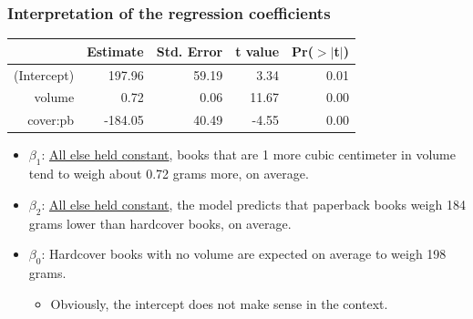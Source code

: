 \documentclass{beamer}
\begin{document}
\begin{frame}
\frametitle{Interpretation of the regression coefficients}

{\small
\begin{center}
\begin{tabular}{rrrrr}
  \hline
 & Estimate & Std. Error & t value & Pr($>$$|$t$|$) \\ 
  \hline
(Intercept) & 197.96 & 59.19 & 3.34 & 0.01 \\ 
  volume & 0.72 & 0.06 & 11.67 & 0.00 \\ 
  cover:pb & -184.05 & 40.49 & -4.55 & 0.00 \\ 
   \hline
\end{tabular}
\end{center}
}

\pause

\begin{itemize}

\item $\beta_1$: \pause \underline{All else held constant}, books that are 1 more cubic centimeter in volume tend to weigh about 0.72 grams more, on average.

\pause

\item $\beta_2$: \pause \underline{All else held constant}, the model predicts that paperback books weigh 184 grams lower than hardcover books, on average.

\pause

\item $\beta_0$: \pause Hardcover books with no volume are expected on average to weigh 198 grams. \pause
\begin{itemize}
\item \pause Obviously, the intercept does not make sense in the context.
\end{itemize}

\end{itemize}

\end{frame}

\end{document}
